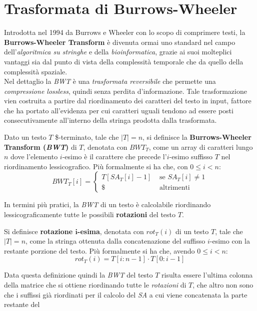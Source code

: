 \section{Trasformata di Burrows-Wheeler}
Introdotta nel 1994 da Burrows e Wheeler con lo scopo di comprimere testi, la
\textbf{Burrows-Wheeler Transform} \cite{bwt} è divenuta ormai uno standard nel
campo dell'\textit{algoritmica su stringhe} e della \textit{bioinformatica},
grazie ai suoi molteplici vantaggi sia dal punto di vista della complessità
temporale che da quello della complessità spaziale.\\
Nel dettaglio la \textit{BWT} è una \textit{trasformata reversibile} che
permette una \textit{compressione lossless}, quindi senza perdita
d'informazione. Tale trasformazione vien costruita a partire dal riordinamento
dei caratteri del testo in input, fattore che ha 
portato all'evidenza per cui caratteri uguali tendono ad essere posti
consecutivamente all'interno della stringa prodotta dalla trasformata.
\begin{definizione}
  Dato un testo $T$ \$-terminato, tale che $|T|=n$, si definisce la
  \textbf{Burrows-Wheeler Transform (\textit{BWT})} di $T$, denotata con
  $BWT_T$, come un array di caratteri lungo $n$ dove l'elemento $i$-esimo è il
  carattere che precede l'$i$-esimo suffisso $T$ nel riordinamento
  lessicografico. Più formalmente si ha che, con $0\leq i<n$:
  \[BWT_T[i]=
    \begin{cases}
      T[SA_T[i]-1]&\mbox{ se } SA_T[i]\neq 1\\
      \$&\mbox{ altrimenti}
    \end{cases}
  \]
\end{definizione}
In termini più pratici, la \textit{BWT} di un testo è calcolabile riordinando
lessicograficamente tutte le possibili \textbf{rotazioni} del testo $T$.
\begin{definizione}
  Si definisce \textbf{rotazione $\mathbf{i}$-esima}, denotata con $rot_T(i)$ di
  un testo $T$, tale che $|T|=n$, come la stringa ottenuta dalla concatenazione
  del suffisso $i$-esimo con la restante porzione del testo. Più formalmente si
  ha che, avendo $0\leq i<n$:
  \[rot_T(i)=T[i:n-1]\cdot T[0:i-1]\]
\end{definizione}
Data questa definizione quindi la \textit{BWT} del testo $T$ risulta essere
l'ultima colonna della matrice che si ottiene riordinando tutte le
\textit{rotazioni} di $T$, che altro non sono che i suffissi già riordinati per
il calcolo del \textit{SA} a cui viene concatenata la parte restante del
